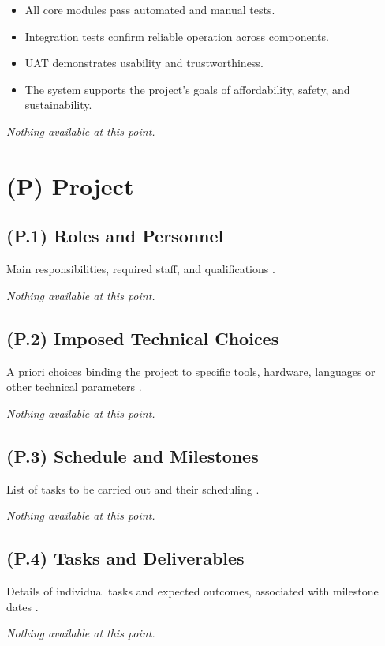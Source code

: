 \documentclass[12pt,letterpaper]{article}
\begin{document}
\begin{itemize}
    \item All core modules pass automated and manual tests.
    \item Integration tests confirm reliable operation across components.
    \item UAT demonstrates usability and trustworthiness.
    \item The system supports the project’s goals of affordability, safety, and sustainability.
\end{itemize}
\textit{Nothing available at this point.}

\clearpage

\section{(P) Project}

\subsection{(P.1) Roles and Personnel}
Main responsibilities, required staff, and qualifications \cite{meyer2022}.

\textit{Nothing available at this point.}

\subsection{(P.2) Imposed Technical Choices}
A priori choices binding the project to specific tools, hardware, languages or other technical parameters \cite{meyer2022}.

\textit{Nothing available at this point.}

\subsection{(P.3) Schedule and Milestones}
List of tasks to be carried out and their scheduling \cite{meyer2022}.

\textit{Nothing available at this point.}

\subsection{(P.4) Tasks and Deliverables}
Details of individual tasks and expected outcomes, associated with milestone dates \cite{meyer2022}.

\textit{Nothing available at this point.}
\end{document}
